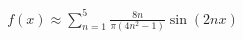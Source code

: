 \documentclass[preview]{standalone}
\begin{document}
\begin{align*}
f(x) \approx \sum_{n=1}^{5} \frac{8n}{\pi(4n^2-1)} \sin(2nx)
\end{align*}
\end{document}

